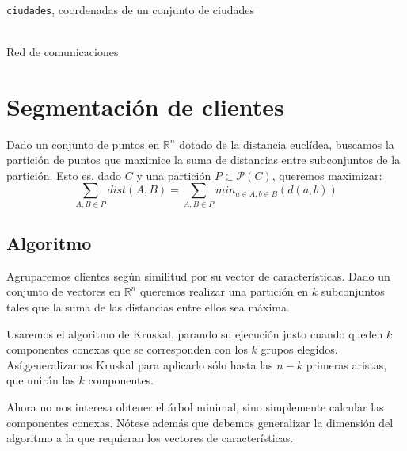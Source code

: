 \documentclass[a4paper, 11pt]{article} %
\begin{document}
    \begin{algorithm}[H]
	\begin{algorithmic}[1]
		\REQUIRE \ \\
        	\texttt{ciudades}, coordenadas de un conjunto de ciudades \\\
		\RETURN{$Kruskal(\texttt{grafo})$}
	\end{algorithmic}
      \caption{Red de comunicaciones}
      \label{red}
    \end{algorithm}
    
\section{Segmentación de clientes}
    Dado un conjunto de puntos en $\mathbb{R}^n$ dotado de la distancia euclídea, buscamos la partición de puntos que
    maximice la suma de distancias entre subconjuntos de la partición. Esto es, dado $C$ y una partición $P \subset \mathcal{P}(C)$,
    queremos maximizar:
    \begin{equation}
     \sum_{A,B \in P} dist(A,B) = \sum_{A,B \in P} min_{a\in A, b\in B}(d(a,b))
    \end{equation}

    
  \subsection{Algoritmo}
    Agruparemos clientes según similitud por su vector de características. Dado un conjunto de vectores en $\mathbb{R}^n$
    queremos realizar una partición en $k$ subconjuntos tales que la suma de las distancias entre ellos sea máxima.
    
    Usaremos el algoritmo de Kruskal, parando su ejecución justo cuando queden $k$ componentes conexas que se corresponden 
    con los $k$ grupos elegidos. Así,generalizamos Kruskal para aplicarlo sólo hasta las $n-k$ primeras aristas, que unirán las $k$ componentes.
    
    Ahora no nos interesa obtener el árbol minimal, sino simplemente calcular las componentes conexas. Nótese además
    que debemos generalizar la dimensión del algoritmo a la que requieran los vectores de características.
    
\end{document}
